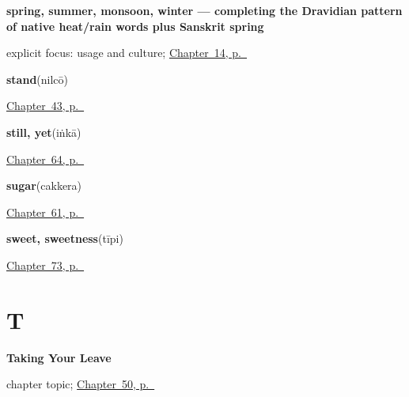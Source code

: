 \noindent\begin{minipage}[t]{\linewidth}
\raggedright
\textbf{spring, summer, monsoon, winter — completing the Dravidian pattern of native heat/rain words plus Sanskrit spring}\enspace\emph{    }\par
\footnotesize explicit focus: usage and culture; \hyperref[ch:te-seasons]{Chapter~14, p.~\pageref*{ch:te-seasons}}
\end{minipage}\par\smallskip

\noindent\begin{minipage}[t]{\linewidth}
\raggedright
\textbf{stand}\enspace\emph{}\enspace(nilcō)\par
\footnotesize \hyperref[ch:te-more-verbs]{Chapter~43, p.~\pageref*{ch:te-more-verbs}}
\end{minipage}\par\smallskip

\noindent\begin{minipage}[t]{\linewidth}
\raggedright
\textbf{still, yet}\enspace\emph{}\enspace(iṅkā)\par
\footnotesize \hyperref[ch:te-joining-words]{Chapter~64, p.~\pageref*{ch:te-joining-words}}
\end{minipage}\par\smallskip

\noindent\begin{minipage}[t]{\linewidth}
\raggedright
\textbf{sugar}\enspace\emph{}\enspace(cakkera)\par
\footnotesize \hyperref[ch:te-kitchen]{Chapter~61, p.~\pageref*{ch:te-kitchen}}
\end{minipage}\par\smallskip

\noindent\begin{minipage}[t]{\linewidth}
\raggedright
\textbf{sweet, sweetness}\enspace\emph{}\enspace(tīpi)\par
\footnotesize \hyperref[ch:te-tastes]{Chapter~73, p.~\pageref*{ch:te-tastes}}
\end{minipage}\par\smallskip

\section*{T}

\noindent\begin{minipage}[t]{\linewidth}
\raggedright
\textbf{Taking Your Leave}\par
\footnotesize chapter topic; \hyperref[ch:te-leave-more]{Chapter~50, p.~\pageref*{ch:te-leave-more}}
\end{minipage}\par\smallskip

